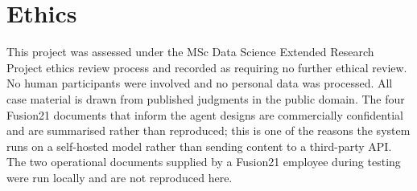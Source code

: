 \chapter{Ethics}
\label{app:ethics}

This project was assessed under the MSc Data Science Extended Research Project
ethics review process and recorded as requiring no further ethical review. No
human participants were involved and no personal data was processed. All case
material is drawn from published judgments in the public domain. The four Fusion21
documents that inform the agent designs are commercially confidential and are
summarised rather than reproduced; this is one of the reasons the system runs on
a self-hosted model rather than sending content to a third-party API. The two
operational documents supplied by a Fusion21 employee during testing were run
locally and are not reproduced here.
